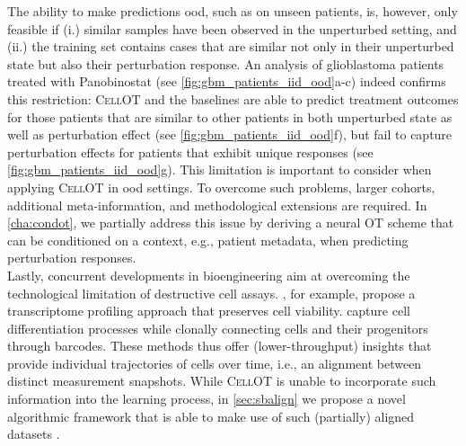 The ability to make predictions \acrlong{ood}, such as on unseen patients, is, however, only feasible if (i.) similar samples have been observed in the unperturbed setting, and (ii.) the training set contains cases that are similar not only in their unperturbed state but also their perturbation response.
An analysis of glioblastoma patients treated with Panobinostat \citep{zhao2021deconvolution} (see \cref{fig:gbm_patients_iid_ood}a-c) indeed confirms this restriction:
\textsc{CellOT} and the baselines are able to predict treatment outcomes for those patients that are similar to other patients in both unperturbed state as well as perturbation effect (see \cref{fig:gbm_patients_iid_ood}f), but fail to capture perturbation effects for patients that exhibit unique responses (see \cref{fig:gbm_patients_iid_ood}g).
This limitation is important to consider when applying \textsc{CellOT} in \acrshort{ood} settings. To overcome such problems, 
larger cohorts, additional meta-information, and methodological extensions are required. In \cref{cha:condot}, we partially address this issue by deriving a neural \acrlong{OT} scheme that can be conditioned on a context, e.g., patient metadata, when predicting perturbation responses. \\

Lastly, concurrent developments in bioengineering aim at overcoming the technological limitation of destructive cell assays. \citet{chen2022live}, for example, propose a transcriptome profiling approach that preserves cell viability. \citet{weinreb2020lineage} capture cell differentiation processes while clonally connecting cells and their progenitors through barcodes. These methods thus offer (lower-throughput) insights that provide individual trajectories of cells over time, i.e., an alignment between distinct measurement snapshots.
While \textsc{CellOT} is unable to incorporate such information into the learning process, in \cref{sec:sbalign} we propose a novel algorithmic framework that is able to make use of such (partially) aligned datasets \citep{shi2023diffusion, tong2023conditional, somnath2023aligned, liu2023image}. 

